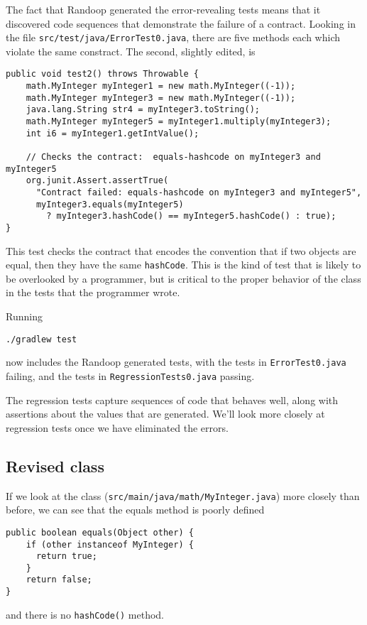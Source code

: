 \documentclass[11pt, oneside]{article} %
\newcommand{\code}[1]{{\texttt{#1}}}
\begin{document}
The fact that Randoop generated the error-revealing tests means that it discovered code sequences that demonstrate the failure of a contract.
Looking in the file \texttt{src/test/java/ErrorTest0.java}, there are five methods each which violate the same constract.
The second, slightly edited, is
\begin{verbatim}
public void test2() throws Throwable {
    math.MyInteger myInteger1 = new math.MyInteger((-1));
    math.MyInteger myInteger3 = new math.MyInteger((-1));
    java.lang.String str4 = myInteger3.toString();
    math.MyInteger myInteger5 = myInteger1.multiply(myInteger3);
    int i6 = myInteger1.getIntValue();
    
    // Checks the contract:  equals-hashcode on myInteger3 and myInteger5
    org.junit.Assert.assertTrue(
      "Contract failed: equals-hashcode on myInteger3 and myInteger5",
      myInteger3.equals(myInteger5) 
        ? myInteger3.hashCode() == myInteger5.hashCode() : true);
}
\end{verbatim}
This test checks the contract that encodes the convention that if two objects are equal, then they have the same \code{hashCode}.
This is the kind of test that is likely to be overlooked by a programmer, but is critical to the proper behavior of the class in the tests that the programmer wrote.

\vfill\pagebreak
Running 
\begin{verbatim}
./gradlew test
\end{verbatim}
now includes the Randoop generated tests, with the tests in \texttt{ErrorTest0.java} failing, and the tests in \texttt{RegressionTests0.java} passing.


The regression tests capture sequences of code that behaves well, along with assertions about the values that are generated. 
We'll look more closely at regression tests once we have eliminated the errors.

\subsection{Revised class}

If we look at the class (\texttt{src/main/java/math/MyInteger.java}) more closely than before, we can see that the equals method is poorly defined
\begin{verbatim}
public boolean equals(Object other) {
    if (other instanceof MyInteger) {
      return true;
    }
    return false;
}
\end{verbatim}
and there is no \code{hashCode()} method.
\end{document}
